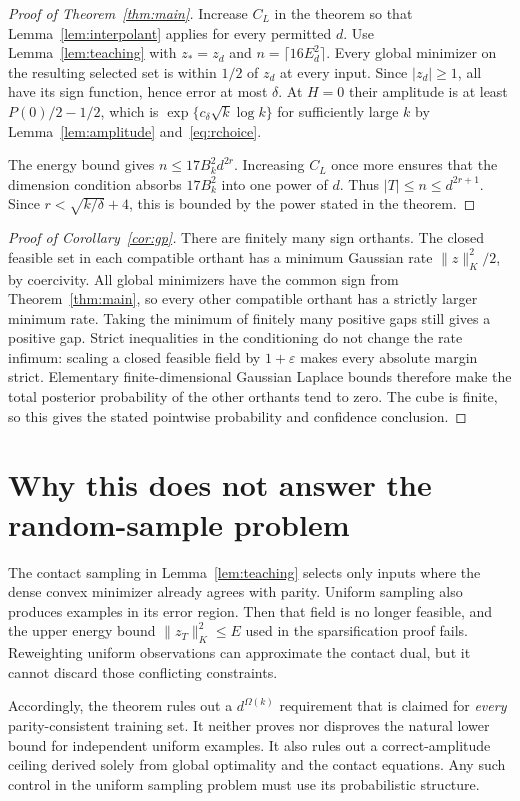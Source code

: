 \documentclass[11pt,a4paper]{article}
\theoremstyle{remark}\newtheorem{remark}[theorem]{Remark}
\newcommand{\normK}[1]{\lVert #1\rVert_K}
\begin{document}
\begin{proof}[Proof of Theorem~\ref{thm:main}]
Increase $C_L$ in the theorem so that
Lemma~\ref{lem:interpolant} applies for every permitted $d$. Use Lemma~\ref{lem:teaching} with
$z_*=z_d$ and $n=\lceil16E_d^2\rceil$. Every global minimizer on the
resulting selected set is within $1/2$ of $z_d$ at every input. Since
$|z_d|\ge1$, all have its sign function, hence error at most $\delta$.
At $H=0$ their amplitude is at least $P(0)/2-1/2$, which is
$\exp\{c_\delta\sqrt{k}\log k\}$ for sufficiently large $k$ by
Lemma~\ref{lem:amplitude} and~\eqref{eq:rchoice}.

The energy bound gives $n\le 17B_k^2d^{2r}$. Increasing $C_L$ once
more ensures that the dimension condition absorbs $17B_k^2$ into one
power of $d$. Thus $|T|\le n\le d^{2r+1}$.
Since $r<\sqrt{k/\delta}+4$, this is bounded by the power stated in
the theorem.
\end{proof}

\begin{proof}[Proof of Corollary~\ref{cor:gp}]
There are finitely many sign orthants. The closed feasible set in each
compatible orthant has a minimum Gaussian rate $\normK z^2/2$, by
coercivity. All global minimizers have the common sign from
Theorem~\ref{thm:main}, so every other compatible orthant has a strictly
larger minimum rate. Taking the minimum of finitely many positive gaps
still gives a positive gap. Strict inequalities in the conditioning do
not change the rate infimum: scaling a closed feasible field by
$1+\varepsilon$ makes every absolute margin strict. Elementary
finite-dimensional Gaussian Laplace bounds therefore make the total
posterior probability of the other orthants tend to zero. The cube is
finite, so this gives the stated pointwise probability and confidence
conclusion.
\end{proof}

\section{Why this does not answer the random-sample problem}
The contact sampling in Lemma~\ref{lem:teaching} selects only inputs where
the dense convex minimizer already agrees with parity. Uniform sampling
also produces examples in its error region. Then that field is no longer
feasible, and the upper energy bound $\normK{z_T}^2\le E$ used in the
sparsification proof fails. Reweighting uniform observations can approximate
the contact dual, but it cannot discard those conflicting constraints.

Accordingly, the theorem rules out a $d^{\Omega(k)}$ requirement that is
claimed for \emph{every} parity-consistent training set. It neither proves
nor disproves the natural lower bound for independent uniform examples.
It also rules out a correct-amplitude ceiling derived solely from global
optimality and the contact equations. Any such control in the uniform
sampling problem must use its probabilistic structure.
\end{document}
